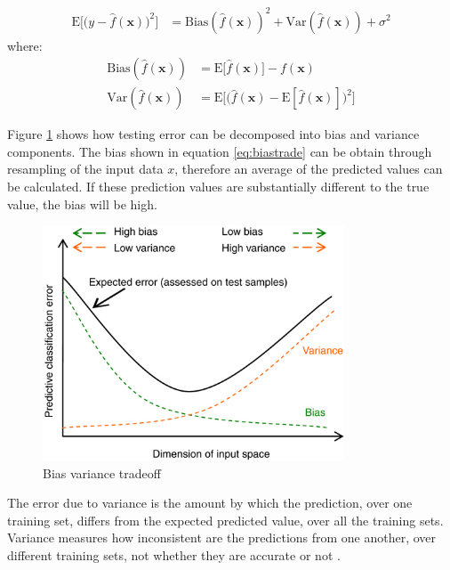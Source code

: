 \begin{align}
\label{eq:bvtrade}
\mathrm{E}\Big[\big(y - \hat{f}(\mathbf{x})\big)^2\Big]
 & = \mathrm{Bias}(\hat{f}(\mathbf{x}))^2 + \mathrm{Var}(\hat{f}(\mathbf{x})) + \sigma^2
\end{align}
\noindent where:
\begin{align}
 \mathrm{Bias}(\hat{f}(\mathbf{x})) &= \mathrm{E}\big[\hat{f}(\mathbf{x})\big] - f(\mathbf{x}) \label{eq:biastrade}\\
 \mathrm{Var}(\hat{f}(\mathbf{x})) &= \mathrm{E}\Big[ \big( \hat{f}(\mathbf{x}) - \mathrm{E}[\hat{f}(\mathbf{x})] \big)^2 \Big]  \label{eq:variancetrade}
\end{align}


Figure \ref{fig:bvtradeoff} shows how
testing error can be decomposed into bias and variance components. 
The bias shown in equation \ref{eq:biastrade} can be obtain through resampling
of the input data $x$, therefore an average of the predicted values can be
calculated. If these prediction values are substantially different to the true
value, the bias will be high.

\begin{figure}[!h]
  \centering
  \includegraphics[width=0.8\textwidth]{img/biasvariancetradeoff}
  \caption{Bias variance tradeoff}
  \label{fig:bvtradeoff}
\end{figure}

The error due to variance is the amount by which the prediction, over one
training set, differs from the expected predicted value, over all the training
sets. Variance measures how inconsistent are the predictions from one another,
over different training sets, not whether they are accurate or not
\cite{gutierrez2015machine}.

